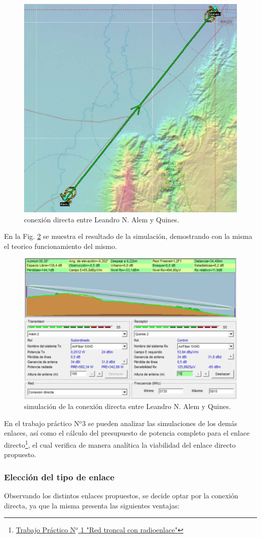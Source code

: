 \documentclass[11pt,a4paper]{article}
\begin{document}
\begin{figure}[htbp]
  \centering
  \includegraphics[width=0.55\linewidth]{fotos_ema/con_directa.jpg}
  \caption{conexión directa entre Leandro N. Alem y Quines.}
  \label{fig:con_directa}
\end{figure}
En la Fig. \ref{fig:sim_directa} se muestra el resultado de la simulación, demostrando con la misma el teorico funcionamiento del mismo.
\begin{figure}[htbp]
  \centering
  \includegraphics[width=0.7\linewidth]{fotos_ema/sim_directa.png}
  \caption{simulación de la conexión directa entre Leandro N. Alem y Quines.}
  \label{fig:sim_directa}
\end{figure}


En el trabajo práctico N$^{\text{o}}3$ se pueden analizar las simulaciones de los demás enlaces, así como el cálculo del presupuesto de potencia completo para el enlace directo\footnote{\href{https://docs.google.com/document/d/1dYO6yN0Ze9tsv_Ijca2n36-JYDfShurftSzc-x_Jx1I}{Trabajo Práctico N$^{o}$ 1 "Red troncal con radioenlace"}}, el cual verifica de manera analítica la viabilidad del enlace directo propuesto.


\subsubsection{Elección del tipo de enlace}
Observando los distintos enlaces propuestos, se decide optar por la conexión directa, ya que la misma presenta las siguientes ventajas:
\end{document}
